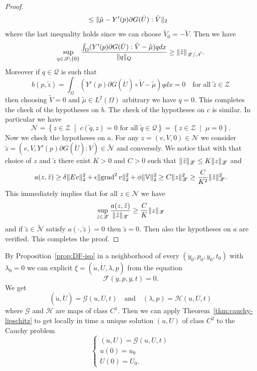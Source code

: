 \begin{proof}
\[\begin{split}
&\le\lVert\tilde\mu-Y'(p)\partial G(\dot{U}):\tilde{V}\rVert_2
\end{split}
\]
where the last inequality holds since we can choose $\tilde{V}_0=-\tilde{V}$. Then we have
\[
\sup_{q\in\mathscr{Q}\setminus\{0\}}\frac{\int_{\Omega}(Y'(p)\partial G(\dot{U}):\tilde{V}-\tilde\mu)qdx}{\lVert q\rVert_Q}\ge\lVert\tilde z\rVert_{\mathscr{Z}/\tilde{\mathscr{N}}}.
\]
Moreover if $q\in\mathscr Q$ is such that
\[
b(p,\tilde z)=\int_{\Omega}(Y'(p)\partial G(\dot{U})\circ\tilde{V}-\tilde\mu)qdx=0\quad\text{for all $\tilde z\in\mathscr{Z}$}
\]
then choosing $\tilde V=0$ and $\tilde\mu\in L^2(\Omega)$ arbitrary we have $q=0$. This completes the check of the hypotheses on $b$. The check of the hypotheses on $c$ is similar. In particular we have
\[
\mathscr{N}=\left\{z\in\mathcal Z\;\middle|\;\text{$c(\tilde q,z)=0$ for all $\tilde q\in\mathscr{Q}$}\right\}=\left\{z\in\mathcal Z\;\middle|\;\mu=0\right\}.
\]
Now we check the hypotheses on $a$. For any $z=(v,V,0)\in\mathscr{N}$ we consider $\tilde z=(v,V,Y'(p)\partial G(\dot U):V)\in\tilde{\mathscr{N}}$ and conversely. We notice that with that choice of $z$ and $\tilde z$ there exist $K>0$ and $C>0$ such that $\lVert\tilde z\rVert_\mathscr{Z}\le K\lVert z\rVert_\mathscr{Z}$ and
\[
\begin{split}
a(z,\tilde z)\ge\delta\lVert Ev\rVert_2^2+\epsilon\lVert\operatorname{grad}^2v\rVert_2^2+\phi\lVert\mathbb{V}\rVert_2^2\ge C\lVert z\rVert_\mathscr{Z}^2\ge\frac{C}{K^2}\lVert\tilde z\rVert_\mathscr{Z}^2.
\end{split}
\]
This immediately implies that for all $z\in\mathscr{N}$ we have
\[
\sup_{\tilde z\in\mathscr{Z}}\frac{a(z,\tilde z)}{\lVert\tilde z\rVert_\mathscr{Z}}\ge\frac{C}{K}\lVert z\rVert_\mathscr{Z}
\]
and if $\tilde z\in\tilde{\mathscr N}$ satisfy $a(\cdot,\tilde z)=0$ then $\tilde z=0$. Then also the hypotheses on $a$ are verified. This completes the proof.
\end{proof}
By Proposition~\ref{prop:DF-iso} in a neighborhood of every $(\dot y_0,p_0,y_0,t_0)$ with $\lambda_0=0$ we can explicit $\xi=(\dot u,\dot U,\lambda,p)$ from the equation
\[
\mathcal{F}(\dot y,p,y,t)=0.
\]
We get
\[
(\dot u,\dot U)=\mathcal{G}(u,U,t)\quad\text{and}\quad(\lambda,p)=\mathcal{H}(u,U,t)
\]
where $\mathcal G$ and $\mathcal H$ are maps of class $C^1$. Then we can apply Theorem~\ref{thm:cauchy-lipschitz} to get locally in time a unique solution $(u,U)$ of class $C^2$ to the Cauchy problem
\[
\begin{cases}
(\dot u,U)=\mathscr{G}(u,U,t) \\
u(0)=u_0 \\
U(0)=U_0.
\end{cases}
\]
